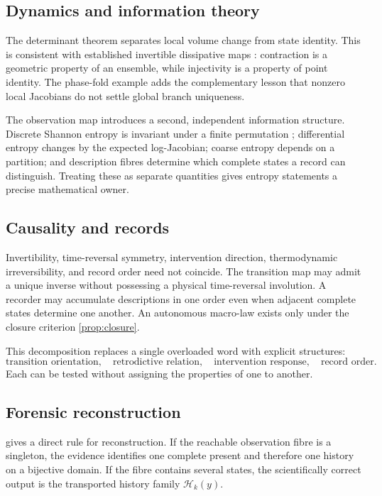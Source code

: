 \subsection{Dynamics and information theory}

The determinant theorem separates local volume change from state identity. This is consistent with established invertible dissipative maps \citep{henon1976,hoover1996,gilbert1999}: contraction is a geometric property of an ensemble, while injectivity is a property of point identity. The phase-fold example adds the complementary lesson that nonzero local Jacobians do not settle global branch uniqueness.

The observation map introduces a second, independent information structure. Discrete Shannon entropy is invariant under a finite permutation \citep{shannon1948a,shannon1948b,cover2006}; differential entropy changes by the expected log-Jacobian; coarse entropy depends on a partition; and description fibres determine which complete states a record can distinguish. Treating these as separate quantities gives entropy statements a precise mathematical owner.

\subsection{Causality and records}

Invertibility, time-reversal symmetry, intervention direction, thermodynamic irreversibility, and record order need not coincide. The transition map may admit a unique inverse without possessing a physical time-reversal involution. A recorder may accumulate descriptions in one order even when adjacent complete states determine one another. An autonomous macro-law exists only under the closure criterion \cref{prop:closure}.

This decomposition replaces a single overloaded word with explicit structures:
\[
\text{transition orientation},\quad
\text{retrodictive relation},\quad
\text{intervention response},\quad
\text{record order}.
\]
Each can be tested without assigning the properties of one to another.

\subsection{Forensic reconstruction}

 gives a direct rule for reconstruction. If the reachable observation fibre is a singleton, the evidence identifies one complete present and therefore one history on a bijective domain. If the fibre contains several states, the scientifically correct output is the transported history family \(\mathcal H_k(y)\).

